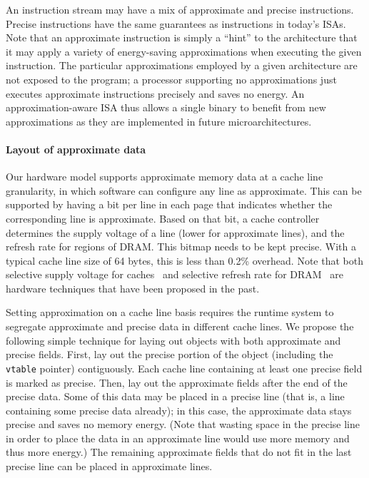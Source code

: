 An instruction stream may have a mix of approximate and precise
instructions. Precise instructions have the same guarantees as
instructions in today's ISAs. Note that an approximate instruction is
simply a ``hint'' to the architecture that it may apply a variety of
energy-saving approximations when executing the given instruction. The
particular approximations employed by a given architecture are not
exposed to the program; a processor supporting no approximations just
executes approximate instructions precisely and saves no
energy. An approximation-aware ISA thus allows a single
binary to benefit from new approximations as they are
implemented in future microarchitectures.

\paragraph{Layout of approximate data} Our hardware model supports
approximate memory data at a cache line granularity, in which software
can configure any line as approximate. This can be supported by having a
bit per line in each page that indicates whether the corresponding line is
approximate. Based on that bit, a cache controller determines
the supply voltage of a line (lower for approximate lines), and the
refresh rate for regions of DRAM\@. This bitmap needs to be kept
precise. With a typical cache line size of 64 bytes, this is less
than 0.2\% overhead. Note that both selective supply voltage for
caches~\cite{drowsycaches} and selective refresh rate for
DRAM~\cite{smartrefresh} are hardware techniques that have been
proposed in the past.

Setting approximation on a cache line basis requires the runtime
system to segregate approximate and precise data in different
cache lines. We propose the following simple
technique for laying out objects with both approximate and precise
fields. First, lay out the precise portion of the object (including
the \texttt{vtable} pointer) contiguously. Each cache line containing at least
one precise field is marked as precise. Then, lay out the approximate
fields after the end of the precise data. Some of this data may
be placed in a precise line (that is, a line containing some precise
data already); in this case, the approximate data stays precise and
saves no memory energy.
(Note that wasting space in the precise line in order to place the
data in an approximate line would use more memory and thus more
energy.)
The remaining approximate fields that do not
fit in the last precise line can be placed in approximate lines.

